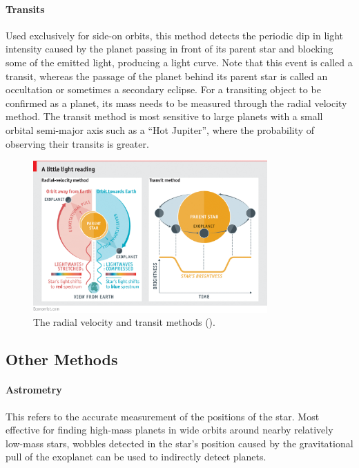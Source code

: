 \documentclass[11pt]{article}
\begin{document}
\hypertarget{transits}{%
\paragraph{Transits}\label{transits}}

Used exclusively for side-on orbits, this method detects the periodic
dip in light intensity caused by the planet passing in front of its
parent star and blocking some of the emitted light, producing a light
curve. Note that this event is called a transit, whereas the passage of
the planet behind its parent star is called an occultation or sometimes
a secondary eclipse. For a transiting object to be confirmed as a
planet, its mass needs to be measured through the radial velocity
method. The transit method is most sensitive to large planets with a
small orbital semi-major axis such as a ``Hot Jupiter'', where the
probability of observing their transits is greater.

\quad
\begin{figure}[!ht]
	\centering
	\includegraphics[width=0.8\textwidth]{../images/methods.png}
	\caption{The radial velocity and transit methods (\cite{Econ}).} \label{Figure 1.a}
\end{figure}


\hypertarget{other-methods}{%
\subsection{Other Methods}\label{other-methods}}

\hypertarget{astrometry}{%
\paragraph{Astrometry}\label{astrometry}}

This refers to the accurate measurement of the positions of the star.
Most effective for finding high-mass planets in wide orbits around
nearby relatively low-mass stars, wobbles detected in the star's
position caused by the gravitational pull of the exoplanet can be used
to indirectly detect planets.
\end{document}
